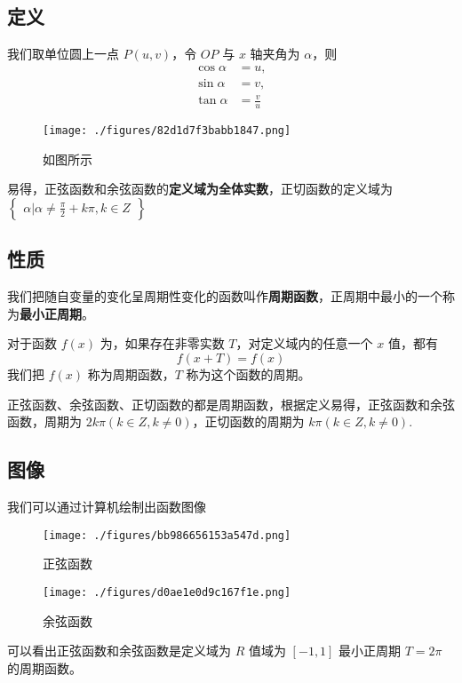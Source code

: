 \begin{issues}
\issueDraft
\end{issues}

\subsection{定义}
我们取单位圆上一点 $P(u,v)$，令 $OP$ 与 $x$ 轴夹角为 $\alpha$，则 
\begin{equation}
\begin{aligned}
\cos\alpha &= u,\\
\sin\alpha &= v,\\
\tan\alpha &= \frac{v}{u}
\end{aligned}
\end{equation}
\begin{figure}[ht]
\centering
\texttt{[image: ./figures/82d1d7f3babb1847.png]}
\caption{如图所示} \label{fig_HsTrFu_3}
\end{figure}
易得，正弦函数和余弦函数的\textbf{定义域为全体实数}，正切函数的定义域为 $\begin{Bmatrix}\alpha|\alpha \neq \frac{\pi}{2}+k\pi,k\in Z\end{Bmatrix}$

\subsection{性质}
我们把随自变量的变化呈周期性变化的函数叫作\textbf{周期函数}，正周期中最小的一个称为\textbf{最小正周期}。

对于函数 $f(x)$ 为，如果存在非零实数 $T$，对定义域内的任意一个 $x$ 值，都有
\begin{equation}
f(x+T) = f(x)
\end{equation}
我们把 $f(x)$ 称为周期函数，$T$ 称为这个函数的周期。

正弦函数、余弦函数、正切函数的都是周期函数，根据定义易得，正弦函数和余弦函数，周期为 $2k\pi(k\in Z,k\neq0)$，正切函数的周期为 $k\pi(k\in Z,k\neq0)$.

\subsection{图像}
我们可以通过计算机绘制出函数图像
\begin{figure}[ht]
\centering
\texttt{[image: ./figures/bb986656153a547d.png]}
\caption{正弦函数} \label{fig_HsTrFu_1}
\end{figure}
\begin{figure}[ht]
\centering
\texttt{[image: ./figures/d0ae1e0d9c167f1e.png]}
\caption{余弦函数} \label{fig_HsTrFu_2}
\end{figure}
可以看出正弦函数和余弦函数是定义域为 $R$ 值域为 $[-1,1]$ 最小正周期 $T = 2\pi$ 的周期函数。

